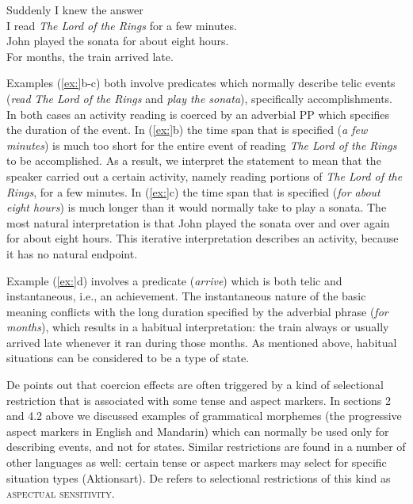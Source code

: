 \ea
\ea Suddenly I knew the answer\\
\ex I read \textit{The Lord of the Rings} for a few minutes.\\
\ex John played the sonata for about eight hours.\\
\ex For months, the train arrived late.
                       \z
\z


Examples (\ref{ex:}b-c) both involve predicates which normally describe telic events (\textit{read} \textit{The Lord of the Rings} and \textit{play the sonata}), specifically accomplishments. In both cases an activity reading is coerced by an adverbial PP which specifies the duration of the event. In (\ref{ex:}b) the time span that is specified (\textit{a few minutes}) is much too short for the entire event of reading \textit{The Lord of the Rings} to be accomplished. As a result, we interpret the statement to mean that the speaker carried out a certain activity, namely reading portions of \textit{The Lord of the Rings}, for a few minutes. In (\ref{ex:}c) the time span that is specified (\textit{for about eight hours}) is much longer than it would normally take to play a sonata. The most natural interpretation is that John played the sonata over and over again for about eight hours. This iterative interpretation describes an activity, because it has no natural endpoint.



Example (\ref{ex:}d) involves a predicate (\textit{arrive}) which is both telic and instantaneous, i.e., an achievement. The instantaneous nature of the basic meaning conflicts with the long duration specified by the adverbial phrase (\textit{for months}), which results in a habitual interpretation: the train always or usually arrived late whenever it ran during those months. As mentioned above, habitual situations can be considered to be a type of state.



De \citet{Swart1998} points out that coercion effects are often triggered by a kind of selectional restriction that is associated with some tense and aspect markers. In sections 2 and 4.2 above we discussed examples of grammatical morphemes (the progressive aspect markers in English and Mandarin) which can normally be used only for describing events, and not for states. Similar restrictions are found in a number of other languages as well: certain tense or aspect markers may select for specific situation types (Aktionsart). De \citet{Swart1998} refers to selectional restrictions of this kind as \textsc{aspectual sensitivity}.




